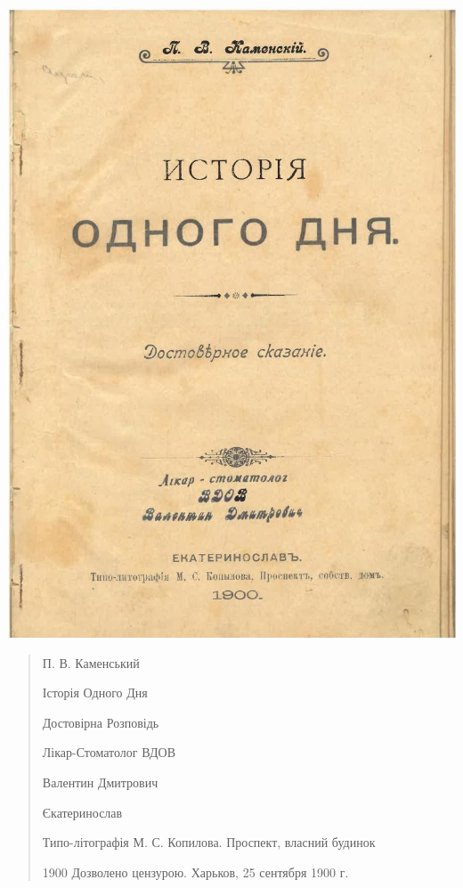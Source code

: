 \documentclass[a4paper,20pt]{report}
\begin{document}

\clearpage

\includegraphics[width=\textwidth]{istoria_odnogo_dnja_title_scan.png}
\clearpage

\begin{quote}
\em

П. В. Каменський

Історія Одного Дня

Достовірна Розповідь

Лікар-Стоматолог ВДОВ

Валентин Дмитрович

Єкатеринослав

Типо-літографія М. С. Копилова. Проспект, власний будинок

1900
Дозволено цензурою. Харьков, 25 сентября 1900 г.

\end{quote}
\end{document}
